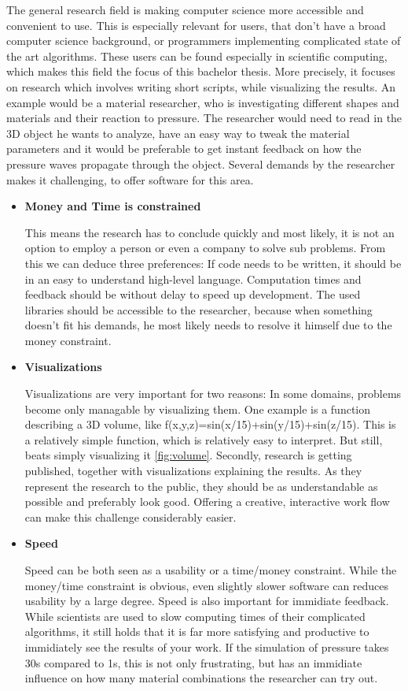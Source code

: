 The general research field is making computer science more accessible and convenient to use. This is especially relevant for users, that don't have a broad computer science background, or programmers implementing complicated state of the art algorithms.
These users can be found especially in scientific computing, which makes this field the focus of this bachelor thesis. 
More precisely, it focuses on research which involves writing short scripts, while visualizing the results. 
An example would be a material researcher, who is investigating different shapes and materials and their reaction to pressure.
The researcher would need to read in the 3D object he wants to analyze, have an easy way to tweak the material parameters and it would be preferable to get instant feedback on how the pressure waves propagate through the object. 
Several demands by the researcher makes it challenging, to offer software for this area.

\begin{itemize} 
    \item \textbf{Money and Time is constrained}
    
    This means the research has to conclude quickly and most likely, it is not an option to employ a person or even a company to solve sub problems.
    From this we can deduce three preferences: If code needs to be written, it should be in an easy to understand high-level language. Computation times and feedback should be without delay to speed up development. The used libraries should be accessible to the researcher, because when something doesn't fit his demands, he most likely needs to resolve it himself due to the money constraint.
    \item  \textbf{Visualizations}

    Visualizations are very important for two reasons:
    In some domains, problems become only managable by visualizing them. One example is a function describing a 3D volume, like f(x,y,z)=sin(x/15)+sin(y/15)+sin(z/15). This is a relatively simple function, which is relatively easy to interpret. But still, beats simply visualizing it \ref{fig:volume}.
    Secondly, research is getting published, together with visualizations explaining the results. As they represent the research to the public, they should be as understandable as possible and preferably look good.
    Offering a creative, interactive work flow can make this challenge considerably easier.
    \item \textbf{Speed}
    
    Speed can be both seen as a usability or a time/money constraint. While the money/time constraint is obvious, even slightly slower software can reduces usability by a large degree.
    Speed is also important for immidiate feedback. While scientists are used to slow computing times of their complicated algorithms, it still holds that it is far more satisfying and productive to immidiately see the results of your work. If the simulation of pressure takes 30s compared to 1s, this is not only frustrating, but has an immidiate influence on how many material combinations the researcher can try out.
\end{itemize} 


